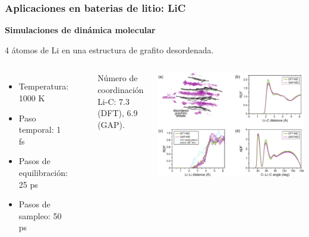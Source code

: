 \documentclass[aspectratio=169]{beamer}
\let\oldtextbf\textbf
\renewcommand{\textbf}[1]{\textcolor{nordblue}{\oldtextbf{#1}}}
\begin{document}
    \begin{frame}
        \frametitle{Aplicaciones en baterias de litio: LiC}

        \textbf{Simulaciones de dinámica molecular}

        4 átomos de Li en una estructura de grafito desordenada.
        
        \begin{columns}
            \begin{itemize}
                \item Temperatura: 1000 K
                \item Paso temporal: 1 fs
                \item Pasos de equilibración: 25 ps 
                \item Pasos de sampleo: 50 ps
            \end{itemize}

            \ \pause

            Número de coordinación Li-C: 7.3 (DFT), 6.9 (GAP).

            \begin{center}
                \includegraphics[width=\columnwidth]{LiC-MD-results.png}
            \end{center}
        \end{columns}
    \end{frame}
    
\end{document}
